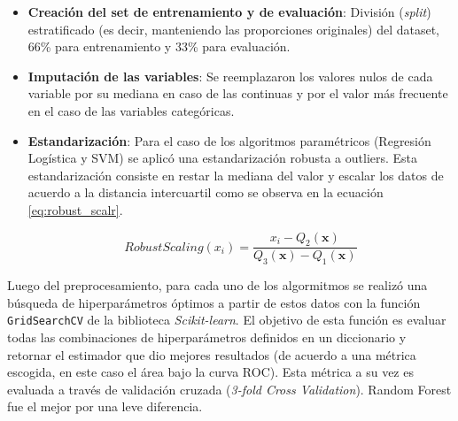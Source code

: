 \begin{itemize}
    \item \textbf{Creación del set de entrenamiento y de evaluación}: División (\textit{split}) estratificado (es decir, manteniendo las proporciones originales) del dataset, 66\% para entrenamiento y 33\% para evaluación. 
    \item \textbf{Imputación de las variables}: Se reemplazaron los valores nulos de cada variable por su mediana en caso de las continuas y por el valor más frecuente en el caso de las variables categóricas.
    \item \textbf{Estandarización}: Para el caso de los algoritmos paramétricos (Regresión Logística y SVM) se aplicó una estandarización robusta a outliers. Esta estandarización consiste en restar la mediana del valor y escalar los datos de acuerdo a la distancia intercuartil como se observa en la ecuación \ref{eq:robust_scalr}.
    
    \begin{equation}
        RobustScaling(x_i) = \frac{x_i - Q_2(\textbf{x})}{Q_3(\textbf{x}) - Q_1(\textbf{x})} 
        \label{eq:robust_scalr}
    \end{equation}
    
    
    
\end{itemize}

Luego del preprocesamiento, para cada uno de los algormitmos se realizó una búsqueda de hiperparámetros óptimos a partir de estos datos con la función \texttt{GridSearchCV} de la biblioteca \textit{Scikit-learn}. El objetivo de esta función es evaluar todas las combinaciones de hiperparámetros definidos en un diccionario y retornar el estimador que dio mejores resultados (de acuerdo a una métrica escogida, en este caso el área bajo la curva ROC). Esta métrica a su vez es evaluada a través de validación cruzada (\textit{3-fold Cross Validation}). Random Forest fue el mejor por una leve diferencia. 


